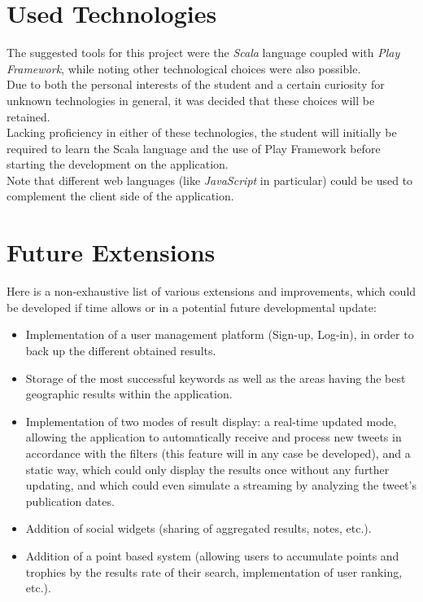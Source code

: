 \documentclass[a4paper,11pt]{report}
\begin{document}
\section{Used Technologies}
The suggested tools for this project were the \emph{Scala} language coupled with \emph{Play Framework}, while noting other technological choices were also possible.\\

Due to both the personal interests of the student and a certain curiosity for unknown technologies in general, it was decided that these choices will be retained.\\

Lacking proficiency in either of these technologies, the student will initially be required to learn the Scala language and the use of Play Framework before starting the development on the application.\\

Note that different web languages (like \emph{JavaScript} in particular) could be used to complement the client side of the application.

\section{Future Extensions}
Here is a non-exhaustive list of various extensions and improvements, which could be developed if time allows or in a potential future developmental update:
\begin{itemize}
	\item Implementation of a user management platform (Sign-up, Log-in), in order to back up the different obtained results.
	\item Storage of the most successful keywords as well as the areas having the best geographic results within the application.
	\item Implementation of two modes of result display: a real-time updated mode, allowing the application to automatically receive and process new tweets in accordance with the filters (this feature will in any case be developed), and a static way, which could only display the results once without any further updating, and which could even simulate a streaming by analyzing the tweet's publication dates.
	\item Addition of social widgets (sharing of aggregated results, notes, etc.).	
	\item Addition of a point based system (allowing users to accumulate points and trophies by the results rate of their search, implementation of user ranking, etc.).
\end{itemize}
\end{document}
